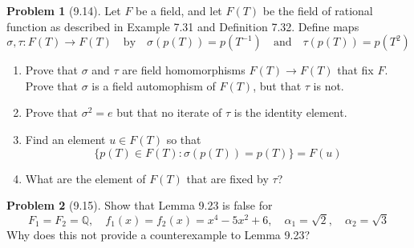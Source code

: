 \documentclass[12pt]{article}
\theoremstyle{definition}
\newtheorem{problem}{Problem}
\begin{document}
\begin{problem}[9.14]
    Let $F$ be a field, and let $F(T)$ be the field of rational function as described in Example 7.31 and Definition 7.32. Define maps 
    \[
        \sigma, \tau : F(T) \longrightarrow F(T) \quad \text{by} \quad \sigma(p(T)) = p(T^{-1}) \quad \text{and} \quad \tau(p(T)) = p(T^2)
    \]
    \begin{enumerate}[label=(\alph*)]
        \item Prove that $\sigma$ and $\tau$ are field homomorphisms $F(T) \longrightarrow F(T)$ that fix $F$. Prove that $\sigma$ is a field automophism of $F(T)$, but that $\tau$ is not.
        
        \begin{solution}

        \end{solution}

        \item Prove that $\sigma^2 = e$ but that no iterate of $\tau$ is the identity element. 
        
        \begin{solution}

        \end{solution}

        \item Find an element $u \in F(T)$ so that
        \[
            \{ p(T) \in F(T) : \sigma(p(T)) = p(T) \} = F(u)
        \]
        \begin{solution}

        \end{solution}

        \item What are the element of $F(T)$ that are fixed by $\tau$?
        
        \begin{solution}

        \end{solution}
    \end{enumerate}
\end{problem}

\begin{problem}[9.15]
    Show that Lemma 9.23 is false for
    \[
        F_1 = F_2 = \mathbb{Q}, \quad f_1(x) = f_2(x) = x^4 - 5x^2 + 6, \quad \alpha_1 = \sqrt{2}, \quad \alpha_2 = \sqrt{3}
    \]
    Why does this not provide a counterexample to Lemma 9.23?

    \begin{solution}

    \end{solution}
\end{problem}
\end{document}

